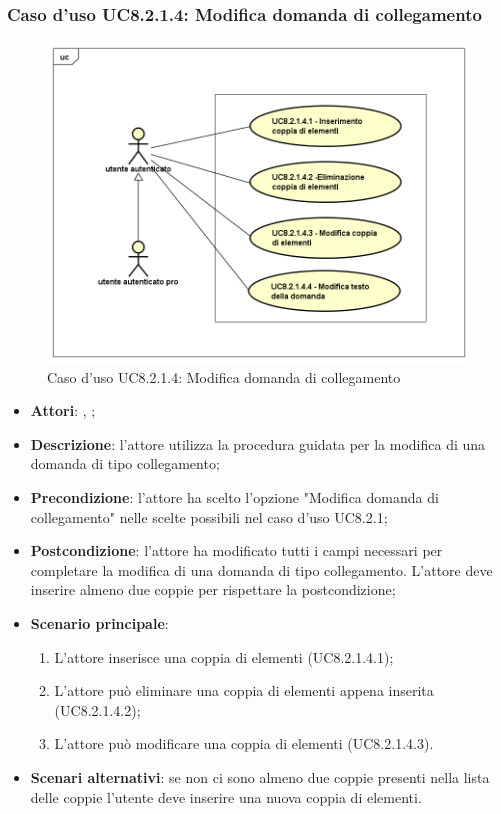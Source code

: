 \subsubsection{Caso d'uso UC8.2.1.4: Modifica domanda di collegamento}
\label{UC8.2.1.4}
\begin{figure}[h]
	\centering
	\includegraphics[scale=0.5,keepaspectratio]{UML/UC8_2_1_4.png}
	\caption{Caso d'uso UC8.2.1.4: Modifica domanda di collegamento}
\end{figure}
\FloatBarrier
\begin{itemize}
	\item \textbf{Attori}: \uau, \uaupro;
	\item \textbf{Descrizione}: l'attore utilizza la procedura guidata per la modifica di una domanda di tipo collegamento; 
	\item \textbf{Precondizione}: l'attore ha scelto l'opzione "Modifica domanda di collegamento" nelle scelte possibili nel caso d'uso UC8.2.1;
	\item \textbf{Postcondizione}: l'attore ha modificato tutti i campi necessari per completare la modifica di una domanda di tipo collegamento. L'attore deve inserire almeno due coppie per rispettare la postcondizione;
	\item \textbf{Scenario principale}: 
	\begin{enumerate}
		\item L'attore inserisce una coppia di elementi (UC8.2.1.4.1);
		\item L'attore può eliminare una coppia di elementi appena inserita (UC8.2.1.4.2);
		\item L'attore può modificare una coppia di elementi (UC8.2.1.4.3).
	\end{enumerate}
	\item \textbf{Scenari alternativi}: se non ci sono almeno due coppie presenti nella lista delle coppie l'utente deve inserire una nuova coppia di elementi.
\end{itemize}

